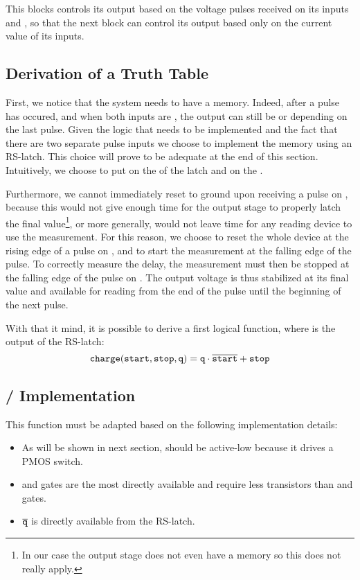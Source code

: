 This blocks controls its output  based on the voltage pulses received on its inputs  and , so that the next block  can control its output  based only on the current value of its inputs.

\subsection{Derivation of a Truth Table}
First, we notice that the system needs to have a memory.
Indeed, after a pulse has occured, and when both inputs are , the output  can still be  or  depending on the last pulse.
Given the logic that needs to be implemented and the fact that there are two separate pulse inputs we choose to implement the memory using an RS-latch.
This choice will prove to be adequate at the end of this section.
Intuitively, we choose to put  on the  of the latch and  on the .

Furthermore, we cannot immediately reset  to ground upon receiving a pulse on , because this would not give enough time for the output stage to properly latch the final value\footnote{In our case the output stage does not even have a memory so this does not really apply.}, or more generally, would not leave time for any reading device to use the measurement.
For this reason, we choose to reset the whole device at the rising edge of a pulse on , and to start the measurement at the falling edge of the pulse.
To correctly measure the delay, the measurement must then be stopped at the falling edge of the pulse on .
The output voltage is thus stabilized at its final value and available for reading from the end of the  pulse until the beginning of the next  pulse.

With that it mind, it is possible to derive a first logical function, where  is the output of the RS-latch:
\begin{equation}
\mathtt{charge}(\mathtt{start}, \mathtt{stop}, \mathtt{q}) = \mathtt{q}\cdot\overline{\mathtt{start}} + \mathtt{stop}\label{eqn:1logic}
\end{equation}

\subsection{\hspace{-.3em}/ Implementation}
This function must be adapted based on the following implementation details:
\begin{itemize}
  \item As will be shown in next section,  should be active-low because it drives a PMOS switch.
  \item {} and  gates are the most directly available and require less transistors than  and  gates.
  \item $\overline{\mathtt{q}}$ is directly available from the RS-latch.
\end{itemize}


